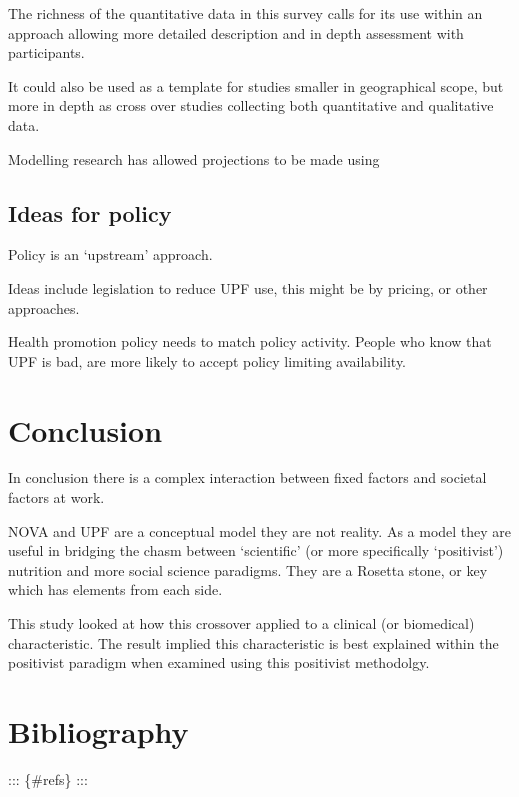 \documentclass[
]{article}
\begin{document}
The richness of the quantitative data in this survey calls for its use
within an approach allowing more detailed description and in depth
assessment with participants.

It could also be used as a template for studies smaller in geographical
scope, but more in depth as cross over studies collecting both
quantitative and qualitative data.

Modelling research has allowed projections to be made using

\hypertarget{ideas-for-policy}{%
\subsection{Ideas for policy}\label{ideas-for-policy}}

Policy is an `upstream' approach.

Ideas include legislation to reduce UPF use, this might be by pricing,
or other approaches.

Health promotion policy needs to match policy activity. People who know
that UPF is bad, are more likely to accept policy limiting availability.

\newpage

\hypertarget{conclusion}{%
\section{Conclusion}\label{conclusion}}

In conclusion there is a complex interaction between fixed factors and
societal factors at work.

NOVA and UPF are a conceptual model they are not reality. As a model
they are useful in bridging the chasm between `scientific' (or more
specifically `positivist') nutrition and more social science paradigms.
They are a Rosetta stone, or key which has elements from each side.

This study looked at how this crossover applied to a clinical (or
biomedical) characteristic. The result implied this characteristic is
best explained within the positivist paradigm when examined using this
positivist methodolgy.

\newpage

\hypertarget{bibliography}{%
\section{Bibliography}\label{bibliography}}

::: \{\#refs\} :::
\end{document}
